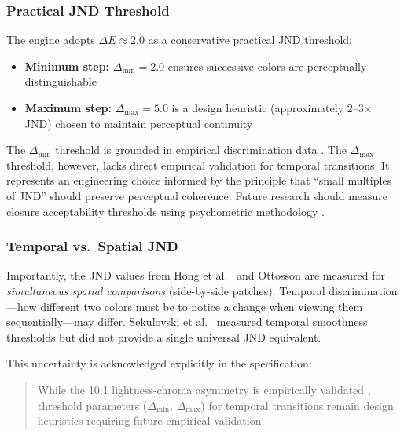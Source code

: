 \subsubsection{Practical JND Threshold}

The engine adopts $\Delta E \approx 2.0$ as a conservative practical JND threshold:

\begin{itemize}
    \item \textbf{Minimum step:} $\Delta_{\min} = 2.0$ ensures successive colors are perceptually distinguishable
    \item \textbf{Maximum step:} $\Delta_{\max} = 5.0$ is a design heuristic (approximately 2–3× JND) chosen to maintain perceptual continuity
\end{itemize}

The $\Delta_{\min}$ threshold is grounded in empirical discrimination data \citep{hong2024}. The $\Delta_{\max}$ threshold, however, lacks direct empirical validation for temporal transitions. It represents an engineering choice informed by the principle that ``small multiples of JND'' should preserve perceptual coherence. Future research should measure closure acceptability thresholds using psychometric methodology \citep{wang2022}.

\subsubsection{Temporal vs.\ Spatial JND}

Importantly, the JND values from Hong et al.\ \citeyearpar{hong2024} and Ottosson \citeyearpar{ottosson2020} are measured for \emph{simultaneous spatial comparisons} (side-by-side patches). Temporal discrimination—how different two colors must be to notice a change when viewing them sequentially—may differ. Sekulovski et al.\ \citeyearpar{sekulovski2007} measured temporal smoothness thresholds but did not provide a single universal JND equivalent.

This uncertainty is acknowledged explicitly in the specification:

\begin{quote}
While the 10:1 lightness-chroma asymmetry is empirically validated \citep{sekulovski2007}, threshold parameters ($\Delta_{\min}$, $\Delta_{\max}$) for temporal transitions remain design heuristics requiring future empirical validation.
\end{quote}

